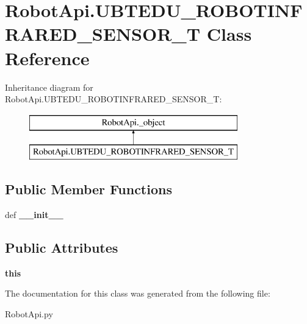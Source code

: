 \hypertarget{classRobotApi_1_1UBTEDU__ROBOTINFRARED__SENSOR__T}{\section{Robot\+Api.\+U\+B\+T\+E\+D\+U\+\_\+\+R\+O\+B\+O\+T\+I\+N\+F\+R\+A\+R\+E\+D\+\_\+\+S\+E\+N\+S\+O\+R\+\_\+\+T Class Reference}
\label{classRobotApi_1_1UBTEDU__ROBOTINFRARED__SENSOR__T}
}
Inheritance diagram for Robot\+Api.\+U\+B\+T\+E\+D\+U\+\_\+\+R\+O\+B\+O\+T\+I\+N\+F\+R\+A\+R\+E\+D\+\_\+\+S\+E\+N\+S\+O\+R\+\_\+\+T\+:\begin{figure}[H]
\begin{center}
\leavevmode
\includegraphics[height=2.000000cm]{classRobotApi_1_1UBTEDU__ROBOTINFRARED__SENSOR__T}
\end{center}
\end{figure}
\subsection*{Public Member Functions}
\begin{DoxyCompactItemize}
\item 
\hypertarget{classRobotApi_1_1UBTEDU__ROBOTINFRARED__SENSOR__T_a6fcdd37a48aa53d3507e440b8fd71fe1}{def {\bfseries \+\_\+\+\_\+init\+\_\+\+\_\+}}\label{classRobotApi_1_1UBTEDU__ROBOTINFRARED__SENSOR__T_a6fcdd37a48aa53d3507e440b8fd71fe1}

\end{DoxyCompactItemize}
\subsection*{Public Attributes}
\begin{DoxyCompactItemize}
\item 
\hypertarget{classRobotApi_1_1UBTEDU__ROBOTINFRARED__SENSOR__T_ab5817918c360ebdf3491c8316c48cead}{{\bfseries this}}\label{classRobotApi_1_1UBTEDU__ROBOTINFRARED__SENSOR__T_ab5817918c360ebdf3491c8316c48cead}

\end{DoxyCompactItemize}


The documentation for this class was generated from the following file\+:\begin{DoxyCompactItemize}
\item 
Robot\+Api.\+py\end{DoxyCompactItemize}
